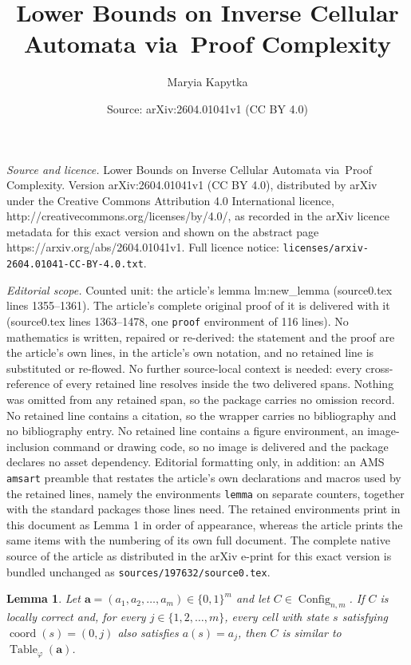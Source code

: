 \documentclass[10pt,a4paper]{amsart}
\title{Lower Bounds on Inverse Cellular Automata via~Proof Complexity}
\author{Maryia Kapytka}
\date{Source: arXiv:2604.01041v1 (CC BY 4.0)}
\newtheorem{lemma}{Lemma}
\DeclareMathOperator{\Config}{Config}
\DeclareMathOperator{\Table}{Table}
\DeclareMathOperator{\coord}{coord}
\newcommand{\tuple}{\mathbf}
\begin{document}
\maketitle

\noindent\emph{Source and licence.} Lower Bounds on Inverse Cellular Automata via~Proof Complexity. Version arXiv:2604.01041v1 (CC BY 4.0), distributed by arXiv under the Creative Commons Attribution 4.0 International licence, http://creativecommons.org/licenses/by/4.0/, as recorded in the arXiv licence metadata for this exact version and shown on the abstract page https://arxiv.org/abs/2604.01041v1. Full licence notice: \texttt{licenses/arxiv-2604.01041-CC-BY-4.0.txt}.\par\smallskip

\noindent\textit{Editorial scope.} Counted unit: the article's lemma lm:new\_lemma (source0.tex lines 1355--1361). The article's complete original proof of it is delivered with it (source0.tex lines 1363--1478, one \texttt{proof} environment of 116 lines). No mathematics is written, repaired or re-derived: the statement and the proof are the article's own lines, in the article's own notation, and no retained line is substituted or re-flowed.  No further source-local context is needed: every cross-reference of every retained line resolves inside the two delivered spans.  Nothing was omitted from any retained span, so the package carries no omission record.  No retained line contains a citation, so the wrapper carries no bibliography and no bibliography entry.  No retained line contains a figure environment, an image-inclusion command or drawing code, so no image is delivered and the package declares no asset dependency.  Editorial formatting only, in addition: an AMS \texttt{amsart} preamble that restates the article's own declarations and macros used by the retained lines, namely the environments \texttt{lemma} on separate counters, together with the standard packages those lines need.  The retained environments print in this document as Lemma 1 in order of appearance, whereas the article prints the same items with the numbering of its own full document.  The complete native source of the article as distributed in the arXiv e-print for this exact version is bundled unchanged as \texttt{sources/197632/source0.tex}.
\begin{lemma}\label{lm:new_lemma}
Let $\tuple a=(a_1,a_2,\dots,a_m)\in\{0,1\}^m$ and let
$C\in\Config_{n,m}$.
If $C$ is locally correct and, for every $j\in\{1,2,\dots,m\}$, every cell
with state $s$ satisfying $\coord(s)=(0,j)$ also satisfies $a(s)=a_j$, then
$C$ is similar to $\Table_\varphi(\tuple a)$.
\end{lemma}
\end{document}
